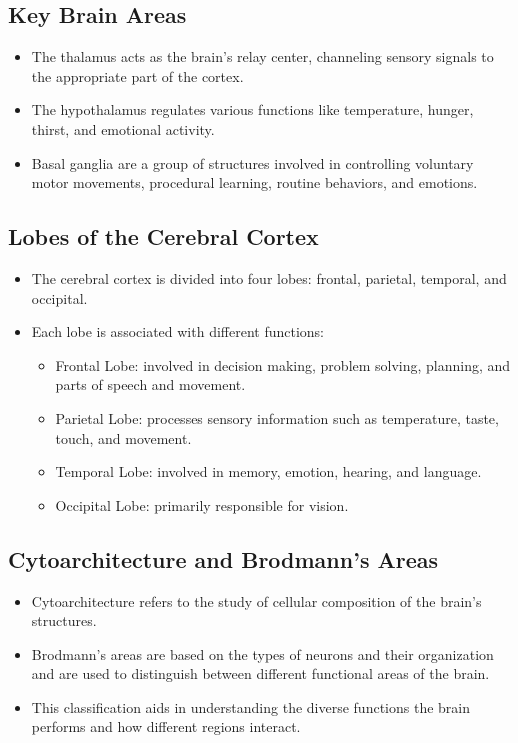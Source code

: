 \documentclass{article}
\begin{document}
\subsection{Key Brain Areas}
\begin{itemize}
    \item The thalamus acts as the brain's relay center, channeling sensory signals to the appropriate part of the cortex.
    \item The hypothalamus regulates various functions like temperature, hunger, thirst, and emotional activity.
    \item Basal ganglia are a group of structures involved in controlling voluntary motor movements, procedural learning, routine behaviors, and emotions.
\end{itemize}

\subsection{Lobes of the Cerebral Cortex}
\begin{itemize}
    \item The cerebral cortex is divided into four lobes: frontal, parietal, temporal, and occipital.
    \item Each lobe is associated with different functions: 
        \begin{itemize}
            \item Frontal Lobe: involved in decision making, problem solving, planning, and parts of speech and movement.
            \item Parietal Lobe: processes sensory information such as temperature, taste, touch, and movement.
            \item Temporal Lobe: involved in memory, emotion, hearing, and language.
            \item Occipital Lobe: primarily responsible for vision.
        \end{itemize}
\end{itemize}

\subsection{Cytoarchitecture and Brodmann's Areas}
\begin{itemize}
    \item Cytoarchitecture refers to the study of cellular composition of the brain's structures.
    \item Brodmann’s areas are based on the types of neurons and their organization and are used to distinguish between different functional areas of the brain.
    \item This classification aids in understanding the diverse functions the brain performs and how different regions interact.
\end{itemize}
\end{document}
